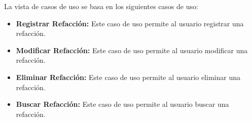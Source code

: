     La vista de casos de uso se basa en los siguientes casos de uso:
    \begin{itemize}
        \item \textbf{Registrar Refacción:} Este caso de uso permite al usuario registrar una refacción.
        \item \textbf{Modificar Refacción:} Este caso de uso permite al usuario modificar una refacción.
        \item \textbf{Eliminar Refacción:} Este caso de uso permite al usuario eliminar una refacción.
        \item \textbf{Buscar Refacción:} Este caso de uso permite al usuario buscar una refacción.
    \end{itemize}
\centering
